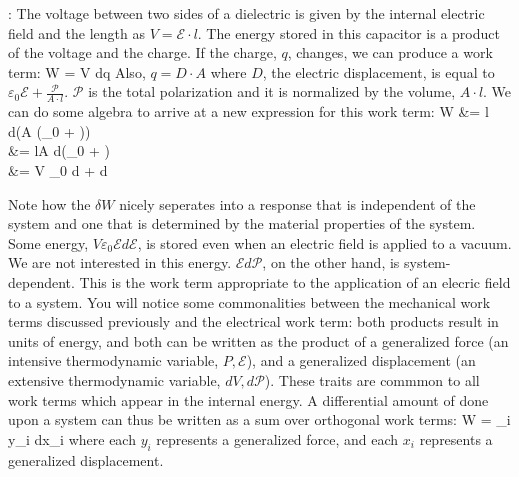 \documentclass[12pt]{article}
\begin{document}
: The voltage between two sides of a dielectric is given by the internal electric field and the length as $V = \mathcal{E} \cdot l$.  The energy stored in this capacitor is a product of the voltage and the charge.  If the charge, $q$, changes, we can produce a work term:
\eqs
\delta W = V dq
\eqe
Also, $q=D \cdot A$ where $D$, the electric displacement, is equal to $\varepsilon_0 \mathcal{E} + \frac{\mathcal{P}}{A\cdot l}$.  $\mathcal{P}$ is the total polarization and it is normalized by the volume, $A\cdot l$. We can do some algebra to arrive at a new expression for this work term:
\eqs
\delta W &=  l  \cdot d(A (\varepsilon_0  + ))\\
&= lA \cdot d(\varepsilon_0  + )\\
&= V \varepsilon_0  d +  d
\eqe

Note how the $\delta W$ nicely seperates into a response that is independent of the system and one that is determined by the material properties of the system. Some energy, $V \varepsilon_0 \mathcal{E} d\mathcal{E}$, is stored even when an electric field is applied to a vacuum. We are not interested in this energy. $\mathcal{E} d\mathcal{P}$, on the other hand, is system-dependent. This is the work term appropriate to the application of an elecric field to a system. You will notice some commonalities between the mechanical work terms discussed previously and the electrical work term: both products result in units of energy, and both can be written as the product of a generalized force (an intensive thermodynamic variable, $P,\mathcal{E}$), and a generalized displacement (an extensive thermodynamic variable, $dV,d\mathcal{P}$). These traits are commmon to all work terms which appear in the internal energy. A differential amount of done upon a system can thus be written as a sum over orthogonal work terms:
\eqs
\delta W = \sum_i y_i dx_i
\eqe
where each $y_i$ represents a generalized force, and each $x_i$ represents a generalized displacement.
\end{document}
